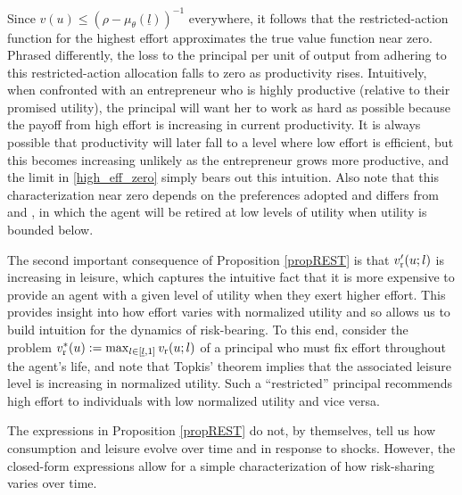 \documentclass[11pt]{article}
\theoremstyle{plain}
\begin{document}
Since $v(u) \leq (\rho - \mu_{\theta}(\underline{l}))^{-1}$ everywhere, it follows that the restricted-action function for the highest effort approximates the true value function near zero. Phrased differently, the loss to the principal per unit of output from adhering to this restricted-action allocation falls to zero as productivity rises. Intuitively, when confronted with an entrepreneur who is highly productive (relative to their promised utility), the principal will want her to work as hard as possible because the payoff from high effort is increasing in current productivity. It is always possible that productivity will later fall to a level where low effort is efficient, but this becomes increasing unlikely as the entrepreneur grows more productive, and the limit in \eqref{high_eff_zero} simply bears out this intuition. Also note that this characterization near zero depends on the preferences adopted and differs from \cite{phelan_computing_1991} and \cite{sannikov_continuous-time_2008}, in which the agent will be retired at low levels of utility when utility is bounded below. 

The second important consequence of Proposition \ref{propREST} is that $v_{\textnormal{r}}'(u;l)$ is increasing in leisure, which captures the intuitive fact that it is more expensive to provide an agent with a given level of utility when they exert higher effort. This provides insight into how effort varies with normalized utility and so allows us to build intuition for the dynamics of risk-bearing. To this end, consider the problem $v^*_{\textnormal{r}}(u) := \max_{l \in [\underline{l},1]} v_{\textnormal{r}}(u;l)$ of a principal who must fix effort throughout the agent's life, and note that Topkis' theorem implies that the associated leisure level is increasing in normalized utility. Such a ``restricted'' principal recommends high effort to individuals with low normalized utility and vice versa. 

The expressions in Proposition \ref{propREST} do not, by themselves, tell us how consumption and leisure evolve over time and in response to shocks. However, the closed-form expressions allow for a simple characterization of how risk-sharing varies over time. 
\end{document}
